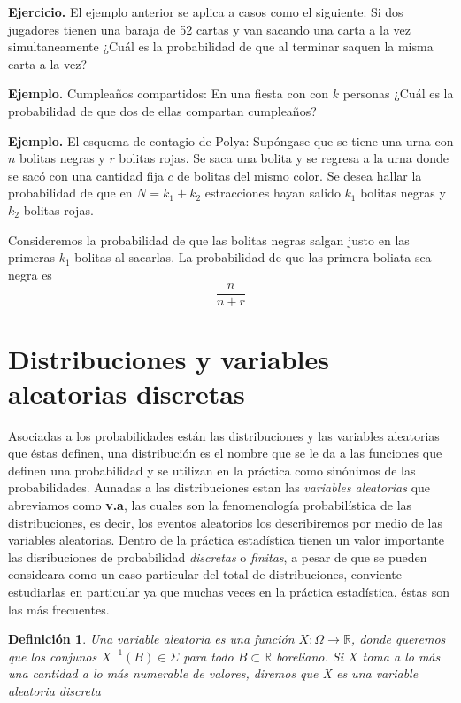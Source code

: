 \documentclass[letterpaper]{book}
\newtheorem{def.}{Definici\'on}[section]
\newcommand{\eje}{{\newline \noindent \sc \textbf{Ejercicio. }}}
\newcommand{\exe}{{\newline \noindent \sc \textbf{Ejemplo. }}}
\newcommand{\om}{\ensuremath{\Omega}}
\newcommand{\sig}{\ensuremath{\Sigma}}
\newcommand{\re}{\ensuremath{\mathbb R }}
\begin{document}
\eje El ejemplo anterior se aplica a casos como el siguiente: Si dos jugadores tienen una baraja de 52 cartas y van sacando una carta a la vez simultaneamente ¿Cuál es la probabilidad de que al terminar saquen la misma carta a la vez?

\exe Cumpleaños compartidos: En una fiesta con con \(k\) personas ¿Cuál es la probabilidad de que dos de ellas compartan cumpleaños? 

\exe El esquema de contagio de Polya: Supóngase que se tiene una urna con \(n\) bolitas negras y \(r\) bolitas rojas. Se saca una bolita y se regresa a la urna donde se sacó con una cantidad fija \(c\) de bolitas del mismo color. Se desea hallar la probabilidad de que en \(N=k_1+k_2\) estracciones hayan salido \(k_1\) bolitas negras y \(k_2\) bolitas rojas.

\noindent Consideremos la probabilidad de que las bolitas negras salgan justo en las primeras \(k_1\) bolitas al sacarlas. La probabilidad de que las primera boliata sea negra es
\[
\frac{n}{n+r}
\]
\section{Distribuciones y variables aleatorias discretas}
\label{sec:orgd96cf0f}

\noindent Asociadas a los probabilidades están las distribuciones y las variables aleatorias que éstas definen, una distribución es el nombre que se le da a las funciones que definen una probabilidad y se utilizan en la práctica como sinónimos de las probabilidades. Aunadas a las distribuciones estan las \emph{variables aleatorias} que abreviamos como \textbf{v.a}, las cuales son la fenomenología probabilística de las distribuciones, es decir, los eventos aleatorios los describiremos por medio de las variables aleatorias. Dentro de la práctica estadística tienen un valor importante las disribuciones de probabilidad \emph{discretas} o \emph{finitas}, a pesar de que se pueden consideara como un caso particular del total de distribuciones, conviente estudiarlas en particular ya que muchas veces en la práctica estadística, éstas son las más frecuentes. 

\begin{def.}
Una variable aleatoria es una función \(X:\om\rightarrow\re\), donde queremos que los conjunos \(X^{-1}(B)\in\sig\) para todo \(B\subset\re\) boreliano. Si \(X\) toma a lo más una cantidad a lo más numerable de valores, diremos que X es una variable aleatoria \emph{discreta}
\end{def.}
\end{document}
